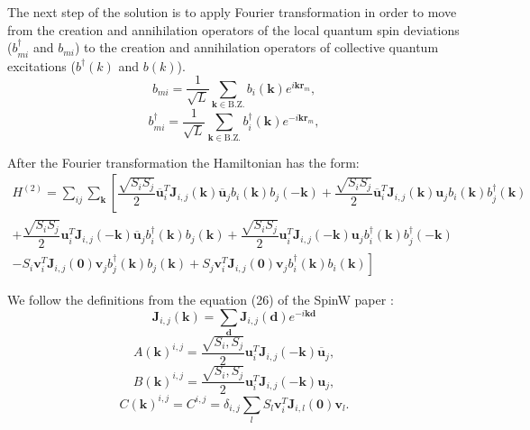 \documentclass[a4paper,12pt]{article}
\begin{document}
    The next step of the solution is to apply Fourier transformation in order to move from the creation and annihilation operators 
    of the local quantum spin deviations ($b^{\dag}_{mi}$ and $b_{mi}$) 
    to the creation and annihilation operators of collective quantum excitations ($b^{\dag}(k)$ and $b(k)$).
    \begin{equation}
        b_{mi} = \dfrac{1}{\sqrt{L}}\sum_{\boldsymbol{k} \in \text{B.Z.}} b_i(\boldsymbol{k})e^{i\boldsymbol{k}\boldsymbol{r}_m},
    \end{equation}
    \begin{equation}
        b^{\dag}_{mi} = \dfrac{1}{\sqrt{L}}\sum_{\boldsymbol{k} \in \text{B.Z.}} b^{\dag}_i(\boldsymbol{k})e^{-i\boldsymbol{k}\boldsymbol{r}_m},
    \end{equation}

    After the Fourier transformation the Hamiltonian has the form:
    \begin{multline}
        H^{(2)} = \sum_{ij}\sum_{\boldsymbol{k}}\left[\dfrac{\sqrt{S_i S_j}}{2}\overline{\boldsymbol{u}}^T_i\boldsymbol{J}_{i,j}(\boldsymbol{k})\overline{\boldsymbol{u}}_jb_{i}(\boldsymbol{k})b_{j}(-\boldsymbol{k}) +
        \dfrac{\sqrt{S_i S_j}}{2} \overline{\boldsymbol{u}}^T_i\boldsymbol{J}_{i,j}(\boldsymbol{k})\boldsymbol{u}_j b_{i}(\boldsymbol{k})b^{\dag}_{j}(\boldsymbol{k})\right. \\+ 
        \dfrac{\sqrt{S_i S_j}}{2}\boldsymbol{u}^T_i\boldsymbol{J}_{i,j}(-\boldsymbol{k})\overline{\boldsymbol{u}}_jb^{\dag}_{i}(\boldsymbol{k})b_{j}(\boldsymbol{k}) +
        \dfrac{\sqrt{S_i S_j}}{2}\boldsymbol{u}^T_i\boldsymbol{J}_{i,j}(-\boldsymbol{k})\boldsymbol{u}_jb^{\dag}_{i}(\boldsymbol{k})b^{\dag}_{j}(-\boldsymbol{k}) \\-
        \left.S_i\boldsymbol{v}^T_i\boldsymbol{J}_{i,j}(\boldsymbol{0})\boldsymbol{v}_jb^{\dag}_{j}(\boldsymbol{k})b_{j}(\boldsymbol{k}) + 
        S_j\boldsymbol{v}^T_i\boldsymbol{J}_{i,j}(\boldsymbol{0})\boldsymbol{v}_jb^{\dag}_{i}(\boldsymbol{k})b_{i}(\boldsymbol{k})\right]
    \end{multline}

    We follow the definitions from the equation (26) of the SpinW paper \cite{toth2015linear}:
    \begin{equation}
        \boldsymbol{J}_{i,j}(\boldsymbol{k}) = \sum_{\boldsymbol{d}}\boldsymbol{J}_{i,j}(\boldsymbol{d})e^{-i\boldsymbol{k}\boldsymbol{d}}
    \end{equation}
    \begin{equation}
        A(\boldsymbol{k})^{i,j} = \dfrac{\sqrt{S_i, S_j}}{2}\boldsymbol{u}^T_i\boldsymbol{J}_{i,j}(-\boldsymbol{k})\overline{\boldsymbol{u}}_j,
    \end{equation}
    \begin{equation}
        B(\boldsymbol{k})^{i,j} = \dfrac{\sqrt{S_i, S_j}}{2}\boldsymbol{u}^T_i\boldsymbol{J}_{i,j}(-\boldsymbol{k})\boldsymbol{u}_j,
    \end{equation}
    \begin{equation}
        C(\boldsymbol{k})^{i,j} = C^{i,j} = \delta_{i,j}\sum_{l}S_l \boldsymbol{v}^T_i\boldsymbol{J}_{i, l}(\boldsymbol{0})\boldsymbol{v}_l.
    \end{equation}
\end{document}
